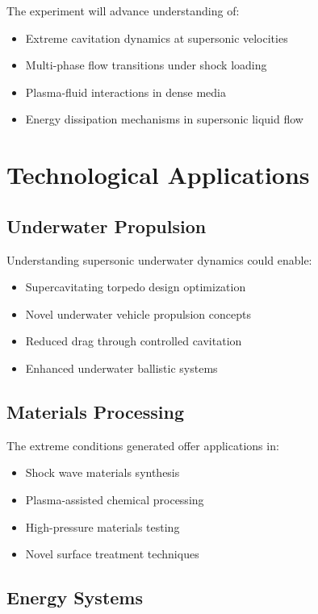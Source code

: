 \documentclass[12pt,a4paper]{article}
\begin{document}
The experiment will advance understanding of:
\begin{itemize}
\item Extreme cavitation dynamics at supersonic velocities
\item Multi-phase flow transitions under shock loading
\item Plasma-fluid interactions in dense media
\item Energy dissipation mechanisms in supersonic liquid flow
\end{itemize}

\section{Technological Applications}

\subsection{Underwater Propulsion}

Understanding supersonic underwater dynamics could enable:
\begin{itemize}
\item Supercavitating torpedo design optimization
\item Novel underwater vehicle propulsion concepts
\item Reduced drag through controlled cavitation
\item Enhanced underwater ballistic systems
\end{itemize}

\subsection{Materials Processing}

The extreme conditions generated offer applications in:
\begin{itemize}
\item Shock wave materials synthesis
\item Plasma-assisted chemical processing
\item High-pressure materials testing
\item Novel surface treatment techniques
\end{itemize}

\subsection{Energy Systems}
\end{document}
